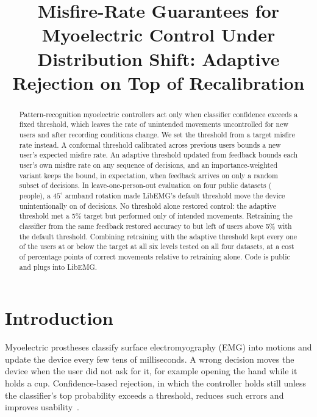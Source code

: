 \documentclass[conference]{IEEEtran}
\begin{document}
\title{Misfire-Rate Guarantees for Myoelectric Control Under Distribution Shift: Adaptive Rejection on Top of Recalibration}

\author{
}

\maketitle

\begin{abstract}
Pattern-recognition myoelectric controllers act only when classifier confidence exceeds a fixed threshold, which leaves the rate of unintended movements uncontrolled for new users and after recording conditions change. We set the threshold from a target misfire rate instead. A conformal threshold calibrated across previous users bounds a new user's expected misfire rate. An adaptive threshold updated from feedback bounds each user's own misfire rate on any sequence of decisions, and an importance-weighted variant keeps the bound, in expectation, when feedback arrives on only a random subset of decisions. In leave-one-person-out evaluation on four public datasets (\nPeople{} people), a $45^\circ$ armband rotation made LibEMG's default threshold move the device unintentionally on \shiftFixedMean{} of decisions. No threshold alone restored control: the adaptive threshold met a 5\% target but performed only \shiftAdaptiveMoves{} of intended movements. Retraining the classifier from the same feedback restored accuracy to \shiftRetrainAcc{} but left \shiftRetrainFixedOver{} of \shiftN{} users above 5\% with the default threshold. Combining retraining with the adaptive threshold kept every one of the \nPeople{} users at or below the target at all six levels tested on all four datasets, at a cost of \deltaMovesRAvsRF{} percentage points of correct movements relative to retraining alone. Code is public and plugs into LibEMG.
\end{abstract}

\section{Introduction}

Myoelectric prostheses classify surface electromyography (EMG) into motions and update the device every few tens of milliseconds. A wrong decision moves the device when the user did not ask for it, for example opening the hand while it holds a cup. Confidence-based rejection, in which the controller holds still unless the classifier's top probability exceeds a threshold, reduces such errors and improves usability~\cite{scheme2013,robertson2019}.
\end{document}
